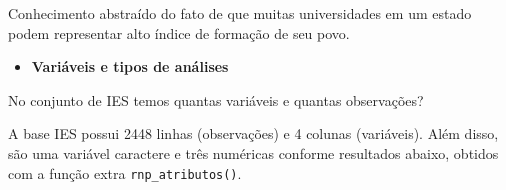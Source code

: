 \documentclass[12pt,]{style/krantz}
\makeatletter
\newenvironment{Shaded}{\begin{snugshade}}{\end{snugshade}}
\newcommand{\KeywordTok}[1]{\textcolor[rgb]{0.13,0.29,0.53}{\textbf{#1}}}
\newcommand{\DataTypeTok}[1]{\textcolor[rgb]{0.13,0.29,0.53}{#1}}
\newcommand{\DecValTok}[1]{\textcolor[rgb]{0.00,0.00,0.81}{#1}}
\newcommand{\StringTok}[1]{\textcolor[rgb]{0.31,0.60,0.02}{#1}}
\newcommand{\CommentTok}[1]{\textcolor[rgb]{0.56,0.35,0.01}{\textit{#1}}}
\newcommand{\OtherTok}[1]{\textcolor[rgb]{0.56,0.35,0.01}{#1}}
\newcommand{\OperatorTok}[1]{\textcolor[rgb]{0.81,0.36,0.00}{\textbf{#1}}}
\newcommand{\NormalTok}[1]{#1}
\providecommand{\tightlist}{%
  \setlength{\itemsep}{0pt}\setlength{\parskip}{0pt}}
\newenvironment{kframe}{%
\medskip{}
\setlength{\fboxsep}{.8em}
 \def\at@end@of@kframe{}%
 \ifinner\ifhmode%
  \def\at@end@of@kframe{\end{minipage}}%
  \begin{minipage}{\columnwidth}%
 \fi\fi%
 \def\FrameCommand##1{\hskip\@totalleftmargin \hskip-\fboxsep
 \colorbox{shadecolor}{##1}\hskip-\fboxsep
     \hskip-\linewidth \hskip-\@totalleftmargin \hskip\columnwidth}%
 \MakeFramed {\advance\hsize-\width
   \@totalleftmargin\z@ \linewidth\hsize
   \@setminipage}}%
 {\par\unskip\endMakeFramed%
 \at@end@of@kframe}
\renewenvironment{Shaded}{\begin{kframe}}{\end{kframe}}
\theoremstyle{definition}
\theoremstyle{definition}
\theoremstyle{definition}
\theoremstyle{remark}
\let\BeginKnitrBlock\begin \let\EndKnitrBlock\end
\makeatother
\begin{document}
\BeginKnitrBlock{solution}
\iffalse{} {Solução. } \fi{}Conhecimento abstraído do fato de que muitas
universidades em um estado podem representar alto índice de formação de
seu povo.
\EndKnitrBlock{solution}

\begin{itemize}
\tightlist
\item
  \textbf{Variáveis e tipos de análises}
\end{itemize}

\BeginKnitrBlock{exercise}
\protect\hypertarget{exr:unnamed-chunk-22}{}{\label{exr:unnamed-chunk-22}
}No conjunto de IES temos quantas variáveis e quantas observações?
\EndKnitrBlock{exercise}

\BeginKnitrBlock{solution}
\iffalse{} {Solução. } \fi{}A base IES possui 2448 linhas (observações)
e 4 colunas (variáveis). Além disso, são uma variável caractere e três
numéricas conforme resultados abaixo, obtidos com a função extra
\texttt{rnp\_atributos()}.
\EndKnitrBlock{solution}

\begin{Shaded}
\end{Shaded}
\end{document}

